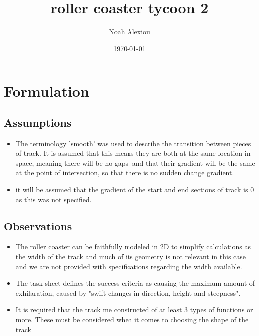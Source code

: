 \documentclass[11pt, letterpaper]{article}
\begin{document}
\begin{titlepage}
	\title{roller coaster tycoon 2}
	\author{Noah Alexiou}
	\date{\today}
	
	\maketitle
	\centering

	
\end{titlepage}


\newpage
\tableofcontents


\newpage


\section{Formulation}
\subsection{Assumptions}
\begin{itemize}
	\item The terminology 'smooth' was used to describe the transition between pieces of track. It is assumed that this means they are both at the same location in space, meaning there will be no gaps, and that their gradient will be the same at the point of intersection, so that there is no sudden change gradient.
	\item it will be assumed that the gradient of the start and end sections of track is 0 as this was not specified. 
\end{itemize}




\subsection{Observations}
\begin{itemize}
	\item The roller coaster can be faithfully modeled in 2D to simplify calculations as the width of the track and much of its geometry is not relevant in this case and we are not provided with specifications regarding the width available. 
	\item The task sheet defines the success criteria as causing the maximum amount of exhilaration, caused by "swift changes in direction, height and steepness". 
		
	\item It is required that the track me constructed of at least 3 types of functions or more. These must be considered when it comes to choosing the shape of the  track

\end{itemize}
\end{document}
